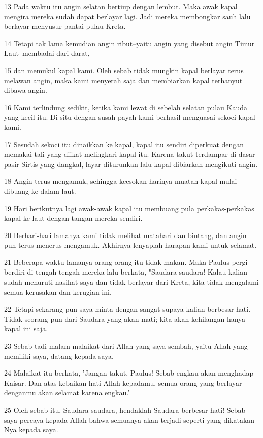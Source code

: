 \par 13 Pada waktu itu angin selatan bertiup dengan lembut. Maka awak kapal mengira mereka sudah dapat berlayar lagi. Jadi mereka membongkar sauh lalu berlayar menyusur pantai pulau Kreta.
\par 14 Tetapi tak lama kemudian angin ribut--yaitu angin yang disebut angin Timur Laut--membadai dari darat,
\par 15 dan memukul kapal kami. Oleh sebab tidak mungkin kapal berlayar terus melawan angin, maka kami menyerah saja dan membiarkan kapal terhanyut dibawa angin.
\par 16 Kami terlindung sedikit, ketika kami lewat di sebelah selatan pulau Kauda yang kecil itu. Di situ dengan susah payah kami berhasil menguasai sekoci kapal kami.
\par 17 Sesudah sekoci itu dinaikkan ke kapal, kapal itu sendiri diperkuat dengan memakai tali yang diikat melingkari kapal itu. Karena takut terdampar di dasar pasir Sirtis yang dangkal, layar diturunkan lalu kapal dibiarkan mengikuti angin.
\par 18 Angin terus mengamuk, sehingga keesokan harinya muatan kapal mulai dibuang ke dalam laut.
\par 19 Hari berikutnya lagi awak-awak kapal itu membuang pula perkakas-perkakas kapal ke laut dengan tangan mereka sendiri.
\par 20 Berhari-hari lamanya kami tidak melihat matahari dan bintang, dan angin pun terus-menerus mengamuk. Akhirnya lenyaplah harapan kami untuk selamat.
\par 21 Beberapa waktu lamanya orang-orang itu tidak makan. Maka Paulus pergi berdiri di tengah-tengah mereka lalu berkata, "Saudara-saudara! Kalau kalian sudah menuruti nasihat saya dan tidak berlayar dari Kreta, kita tidak mengalami semua kerusakan dan kerugian ini.
\par 22 Tetapi sekarang pun saya minta dengan sangat supaya kalian berbesar hati. Tidak seorang pun dari Saudara yang akan mati; kita akan kehilangan hanya kapal ini saja.
\par 23 Sebab tadi malam malaikat dari Allah yang saya sembah, yaitu Allah yang memiliki saya, datang kepada saya.
\par 24 Malaikat itu berkata, 'Jangan takut, Paulus! Sebab engkau akan menghadap Kaisar. Dan atas kebaikan hati Allah kepadamu, semua orang yang berlayar denganmu akan selamat karena engkau.'
\par 25 Oleh sebab itu, Saudara-saudara, hendaklah Saudara berbesar hati! Sebab saya percaya kepada Allah bahwa semuanya akan terjadi seperti yang dikatakan-Nya kepada saya.
